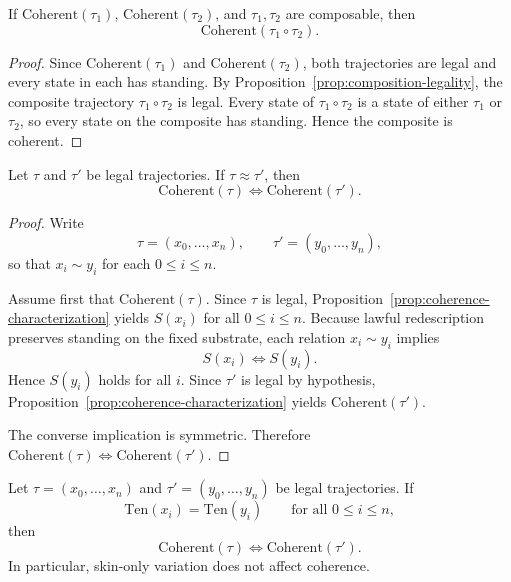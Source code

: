 \begin{theorem}
\label{thm:composition-closure}
If $\mathrm{Coherent}(\tau_1)$, $\mathrm{Coherent}(\tau_2)$, and $\tau_1,\tau_2$ are composable, then
\[
\mathrm{Coherent}(\tau_1\circ \tau_2).
\]
\end{theorem}

\begin{proof}
Since $\mathrm{Coherent}(\tau_1)$ and $\mathrm{Coherent}(\tau_2)$, both trajectories are legal and every state in each has standing. By Proposition~\ref{prop:composition-legality}, the composite trajectory $\tau_1\circ \tau_2$ is legal. Every state of $\tau_1\circ \tau_2$ is a state of either $\tau_1$ or $\tau_2$, so every state on the composite has standing. Hence the composite is coherent.\cite{MaleyTrajectory}
\end{proof}

\begin{theorem}
\label{thm:lawful-redescription-invariance}
Let $\tau$ and $\tau'$ be legal trajectories. If $\tau \approx \tau'$, then
\[
\mathrm{Coherent}(\tau) \iff \mathrm{Coherent}(\tau').
\]
\end{theorem}

\begin{proof}
Write
\[
\tau=(x_0,\dots,x_n), \qquad \tau'=(y_0,\dots,y_n),
\]
so that $x_i \sim y_i$ for each $0\le i\le n$.

Assume first that $\mathrm{Coherent}(\tau)$. Since $\tau$ is legal, Proposition~\ref{prop:coherence-characterization} yields $S(x_i)$ for all $0\le i\le n$. Because lawful redescription preserves standing on the fixed substrate, each relation $x_i \sim y_i$ implies
\[
S(x_i) \iff S(y_i).
\]
Hence $S(y_i)$ holds for all $i$. Since $\tau'$ is legal by hypothesis, Proposition~\ref{prop:coherence-characterization} yields $\mathrm{Coherent}(\tau')$.

The converse implication is symmetric. Therefore $\mathrm{Coherent}(\tau) \iff \mathrm{Coherent}(\tau')$.\cite{MaleyTrajectory}
\end{proof}

\begin{corollary}
\label{cor:tensor-determined-coherence}
Let $\tau=(x_0,\dots,x_n)$ and $\tau'=(y_0,\dots,y_n)$ be legal trajectories. If
\[
\mathrm{Ten}(x_i)=\mathrm{Ten}(y_i) \qquad \text{for all } 0\le i\le n,
\]
then
\[
\mathrm{Coherent}(\tau) \iff \mathrm{Coherent}(\tau').
\]
In particular, skin-only variation does not affect coherence.
\end{corollary}

